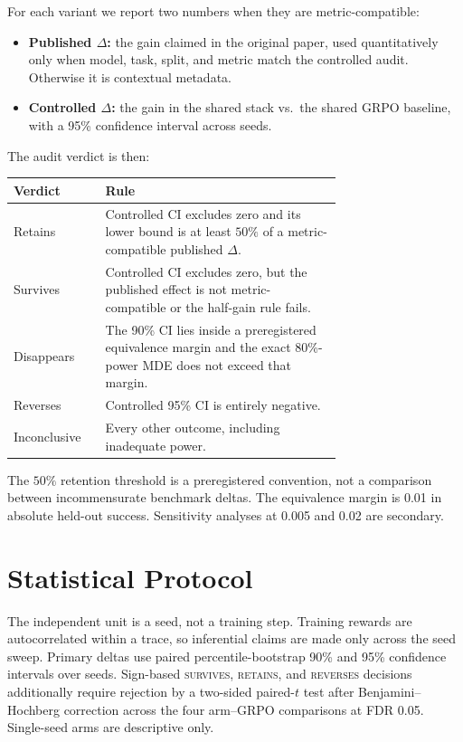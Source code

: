 \documentclass[11pt]{article}
\begin{document}
For each variant we report two numbers when they are metric-compatible:
\begin{itemize}[leftmargin=1.4em, itemsep=2pt]
  \item \textbf{Published $\Delta$:} the gain claimed in the original paper,
    used quantitatively only when model, task, split, and metric match the
    controlled audit. Otherwise it is contextual metadata.
  \item \textbf{Controlled $\Delta$:} the gain in the shared stack vs.\ the
    shared GRPO baseline, with a 95\% confidence interval across seeds.
\end{itemize}
The audit verdict is then:
\begin{center}
\small
\begin{tabular}{@{}lp{0.72\linewidth}@{}}
\toprule
\textbf{Verdict} & \textbf{Rule}\\
\midrule
Retains & Controlled CI excludes zero and its lower bound is at least $50\%$
  of a metric-compatible published $\Delta$.\\
Survives & Controlled CI excludes zero, but the published effect is not
  metric-compatible or the half-gain rule fails.\\
Disappears & The 90\% CI lies inside a preregistered equivalence margin and the
  exact 80\%-power MDE does not exceed that margin.\\
Reverses & Controlled 95\% CI is entirely negative.\\
Inconclusive & Every other outcome, including inadequate power.\\
\bottomrule
\end{tabular}
\end{center}
The $50\%$ retention threshold is a preregistered convention, not a comparison
between incommensurate benchmark deltas. The equivalence margin is 0.01 in
absolute held-out success. Sensitivity analyses at 0.005 and 0.02 are secondary.

\section{Statistical Protocol}
\label{sec:stats}

The independent unit is a seed, not a training step. Training rewards are
autocorrelated within a trace, so inferential claims are made only across the
seed sweep. Primary deltas use paired percentile-bootstrap 90\% and 95\%
confidence intervals over seeds. Sign-based \textsc{survives}, \textsc{retains},
and \textsc{reverses} decisions additionally require rejection by a two-sided
paired-$t$ test after Benjamini--Hochberg correction across the four arm--GRPO
comparisons at FDR 0.05. Single-seed arms are descriptive only.
\end{document}
